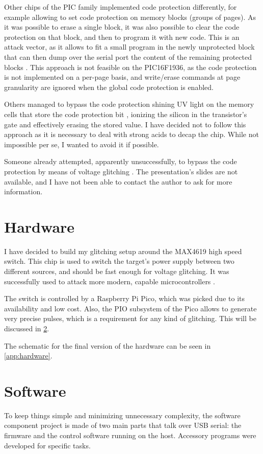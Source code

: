 \documentclass[a4paper,english,twoside,10pt]{article}
\begin{document}
Other chips of the PIC family implemented code protection differently, for example allowing to set code protection on memory blocks (groups of pages). As it was possible to erase a single block, it was also possible to clear the code protection on that block, and then to program it with new code. This is an attack vector, as it allows to fit a small program in the newly unprotected block that can then dump over the serial port the content of the remaining protected blocks \cite{meriac2010heart}. This approach is not feasible on the PIC16F1936, as the code protection is not implemented on a per-page basis, and write/erase commands at page granularity are ignored when the global code protection is enabled.

Others managed to bypass the code protection shining UV light on the memory cells that store the code protection bit \cite{bunniepic}, ionizing the silicon in the transistor's gate and effectively erasing the stored value. I have decided not to follow this approach as it is necessary to deal with strong acids to decap the chip. While not impossible per se, I wanted to avoid it if possible.

Someone already attempted, apparently unsuccessfully, to bypass the code protection by means of voltage glitching \cite{silviocopyprotection}. The presentation's slides are not available, and I have not been able to contact the author to ask for more information.



\section{Hardware}
I have decided to build my glitching setup around the MAX4619 \cite{maxim:MAX4617-MAX4619} high speed switch. This chip is used to switch the target's power supply between two different sources, and should be fast enough for voltage glitching. It was successfully used to attack more modern, capable microcontrollers \cite{gerlinskyLPC}.

The switch is controlled by a Raspberry Pi Pico, which was picked due to its availability and low cost. Also, the PIO subsystem of the Pico allows to generate very precise pulses, which is a requirement for any kind of glitching. This will be discussed in \cref{sect:software}.

The schematic for the final version of the hardware can be seen in \cref{app:hardware}.



\section{Software}\label{sect:software}
To keep things simple and minimizing unnecessary complexity, the software component project is made of two main parts that talk over USB serial: the firmware and the control software running on the host. Accessory programs were developed for specific tasks.
\end{document}
